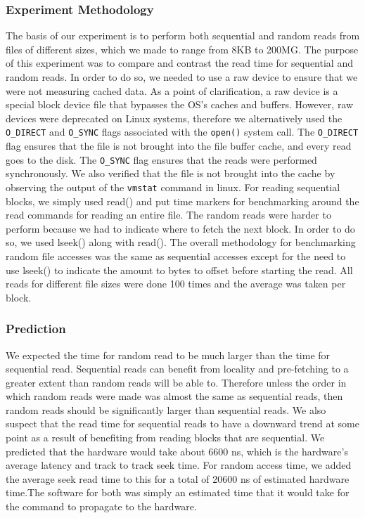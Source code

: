 \documentclass{article} %
\begin{document}
\subsubsection{Experiment Methodology}
The basis of our experiment is to perform both sequential and random reads from files of different sizes, which we made to range from 8KB to 200MG. The purpose of this experiment was to compare and contrast the read time for sequential and random reads. In order to do so, we needed to use a raw device to ensure that we were not measuring cached data. As a point of clarification, a raw device is a special block device file that bypasses the OS's caches and buffers. However, raw devices were deprecated on Linux systems, therefore we alternatively used the \texttt{O\_DIRECT} and \texttt{O\_SYNC} flags associated with the \texttt{open()} system call. The \texttt{O\_DIRECT} flag ensures that the file is not brought into the file buffer cache, and every read goes to the disk. The \texttt{O\_SYNC} flag ensures that the reads were performed synchronously. 
We also verified that the file is not brought into the cache by observing the output of the \texttt{vmstat} command in linux. For reading sequential blocks, we simply used read() and put time markers for benchmarking around the read commands for reading an entire file. The random reads were harder to perform because we had to indicate where to fetch the next block. In order to do so, we used lseek() along with read(). The overall methodology for benchmarking random file accesses was the same as sequential accesses except for the need to use lseek() to indicate the amount to bytes to offset before starting the read. All reads for different file sizes were done 100 times and the average was taken per block.

\subsubsection{Prediction}
We expected the time for random read to be much larger than the time for sequential read. Sequential reads can benefit from locality and pre-fetching to a greater extent than random reads will be able to. Therefore unless the order in which random reads were made was almost the same as sequential reads, then random reads should be significantly larger than sequential reads. We also suspect that the read time for sequential reads to have a downward trend at some point as a result of benefiting from reading blocks that are sequential. We predicted that the hardware would take about 6600 ns, which is the hardware's average latency and track to track seek time. For random access time, we added the average seek read time to this for a total of 20600 ns of estimated hardware time.The software for both was simply an estimated time that it would take for the command to propagate to the hardware.
\end{document}
